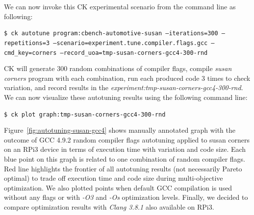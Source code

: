 We can now invoke this CK experimental scenario from the command line as following:

\begin{flushleft}
\texttt{\$ ck autotune program:cbench-automotive-susan --iterations=300 --repetitions=3 
  --scenario=experiment.tune.compiler.flags.gcc
  --cmd\_key=corners --record\_uoa=tmp-susan-corners-gcc4-300-rnd}
\end{flushleft}

CK will generate 300 random combinations of compiler flags, compile \textit{susan corners} program 
with each combination, run each produced code 3 times to check variation, and record
results in the \textit{experiment:tmp-susan-corners-gcc4-300-rnd}.
%
We can now visualize these autotuning results using the following command line:
\begin{flushleft}
\texttt{\$ ck plot graph:tmp-susan-corners-gcc4-300-rnd}
\end{flushleft}

Figure~\ref{fig:autotuning-susan-gcc4} shows manually annotated graph 
with the outcome of GCC 4.9.2 random compiler flags autotuning 
applied to susan corners on an RPi3 device in terms of execution 
time with variation and code size.
%
Each blue point on this graph is related to one combination of random compiler flags.
%
Red line highlights the frontier of all autotuning results (not necessarily Pareto optimal) 
to trade off execution time and code size during multi-objective optimization.
%
We also plotted points when default GCC compilation is used without any flags 
or with \textit{-O3} and \textit{-Os} optimization levels.
%
Finally, we decided to compare optimization results with \textit{Clang 3.8.1} also available on RPi3.

